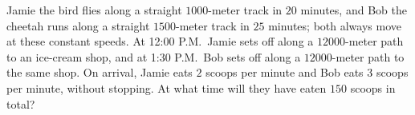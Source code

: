 Jamie the bird flies along a straight $1000$-meter track in $20$ minutes, and Bob the cheetah runs along a straight $1500$-meter track in $25$ minutes; both always move at these constant speeds. At 12:00 P.M.\ Jamie sets off along a $12000$-meter path to an ice-cream shop, and at 1:30 P.M.\ Bob sets off along a $12000$-meter path to the same shop. On arrival, Jamie eats $2$ scoops per minute and Bob eats $3$ scoops per minute, without stopping. At what time will they have eaten $150$ scoops in total?
